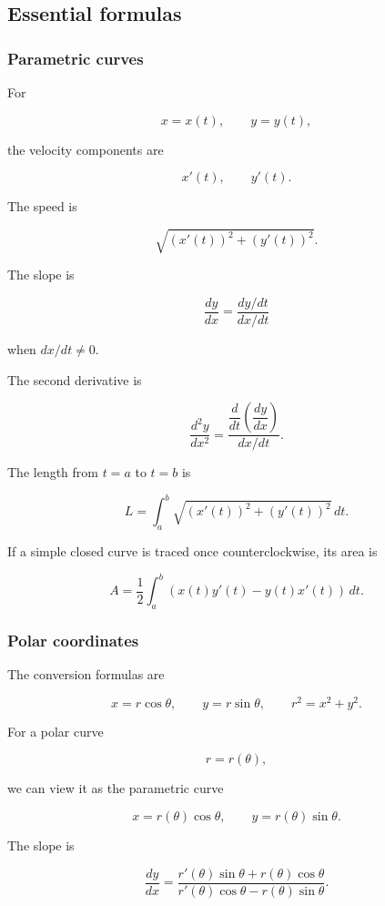 \subsection{Essential formulas}
\label{subsec:essential-formulas-parametric-polar}

\subsubsection*{Parametric curves}

For

\[
x=x(t),
\qquad
y=y(t),
\]

the velocity components are

\[
x'(t),
\qquad
y'(t).
\]

The speed is

\[
\boxed{
\sqrt{(x'(t))^2+(y'(t))^2}.
}
\]

The slope is

\[
\boxed{
\frac{dy}{dx}
=
\frac{dy/dt}{dx/dt}
}
\]

when \(dx/dt\neq0\).

The second derivative is

\[
\boxed{
\frac{d^2y}{dx^2}
=
\frac{\dfrac{d}{dt}\left(\dfrac{dy}{dx}\right)}{dx/dt}.
}
\]

The length from \(t=a\) to \(t=b\) is

\[
\boxed{
L=
\int_a^b
\sqrt{(x'(t))^2+(y'(t))^2}\,dt.
}
\]

If a simple closed curve is traced once counterclockwise, its area is

\[
\boxed{
A=
\frac12\int_a^b
\left(x(t)y'(t)-y(t)x'(t)\right)\,dt.
}
\]

\subsubsection*{Polar coordinates}

The conversion formulas are

\[
\boxed{
x=r\cos\theta,
\qquad
y=r\sin\theta,
\qquad
r^2=x^2+y^2.
}
\]

For a polar curve

\[
r=r(\theta),
\]

we can view it as the parametric curve

\[
x=r(\theta)\cos\theta,
\qquad
y=r(\theta)\sin\theta.
\]

The slope is

\[
\boxed{
\frac{dy}{dx}
=
\frac{r'(\theta)\sin\theta+r(\theta)\cos\theta}
{r'(\theta)\cos\theta-r(\theta)\sin\theta}.
}
\]

